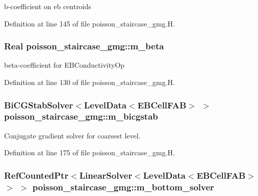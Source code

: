 b-\/coefficient on eb centroids 



Definition at line 145 of file poisson\+\_\+staircase\+\_\+gmg.\+H.

\subsubsection[{\texorpdfstring{m\+\_\+beta}{m_beta}}]{\setlength{\rightskip}{0pt plus 5cm}Real poisson\+\_\+staircase\+\_\+gmg\+::m\+\_\+beta\hspace{0.3cm}{\ttfamily [protected]}}\hypertarget{classpoisson__staircase__gmg_ad371381d12898451a9e71b71211c44a4}{}\label{classpoisson__staircase__gmg_ad371381d12898451a9e71b71211c44a4}


beta-\/coefficient for E\+B\+Conductivity\+Op 



Definition at line 130 of file poisson\+\_\+staircase\+\_\+gmg.\+H.

\subsubsection[{\texorpdfstring{m\+\_\+bicgstab}{m_bicgstab}}]{\setlength{\rightskip}{0pt plus 5cm}Bi\+C\+G\+Stab\+Solver$<$Level\+Data$<$E\+B\+Cell\+F\+AB$>$ $>$ poisson\+\_\+staircase\+\_\+gmg\+::m\+\_\+bicgstab\hspace{0.3cm}{\ttfamily [protected]}}\hypertarget{classpoisson__staircase__gmg_aeee3ab11fb84f1bf675bf40af8ba748d}{}\label{classpoisson__staircase__gmg_aeee3ab11fb84f1bf675bf40af8ba748d}


Conjugate gradient solver for coarsest level. 



Definition at line 175 of file poisson\+\_\+staircase\+\_\+gmg.\+H.

\subsubsection[{\texorpdfstring{m\+\_\+bottom\+\_\+solver}{m_bottom_solver}}]{\setlength{\rightskip}{0pt plus 5cm}Ref\+Counted\+Ptr$<$Linear\+Solver$<$Level\+Data$<$E\+B\+Cell\+F\+AB$>$ $>$ $>$ poisson\+\_\+staircase\+\_\+gmg\+::m\+\_\+bottom\+\_\+solver\hspace{0.3cm}{\ttfamily [protected]}}\hypertarget{classpoisson__staircase__gmg_a90c313cc0603bbad78492a6d20853cd5}{}\label{classpoisson__staircase__gmg_a90c313cc0603bbad78492a6d20853cd5}


